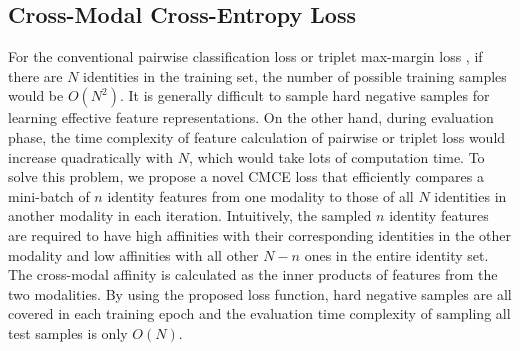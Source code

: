 \subsection{Cross-Modal Cross-Entropy Loss}
For the conventional pairwise classification loss \cite{Antol_2015_ICCV,lu2016hierarchical} or triplet max-margin loss \cite{wang2016learning,reed2016learning}, if there are $N$ identities in the training set, the number of possible training samples would be $O(N^2)$. It is generally difficult to sample hard negative samples for learning effective feature representations.
On the other hand, during evaluation phase, the time complexity of feature calculation of pairwise or triplet loss would increase quadratically with $N$, which would take lots of computation time.
To solve this problem, we propose a novel CMCE loss that efficiently compares a mini-batch of $n$ identity features from one modality to those of all $N$ identities in another modality in each iteration.
Intuitively, the sampled $n$ identity features are required to have high affinities with their corresponding identities in the other modality and low affinities with all other $N-n$ ones in the entire identity set. The cross-modal affinity is calculated as the inner products of features from the two modalities.
By using the proposed loss function, hard negative samples are all covered in each training epoch and the evaluation time complexity of sampling all test samples is only $O(N)$.

